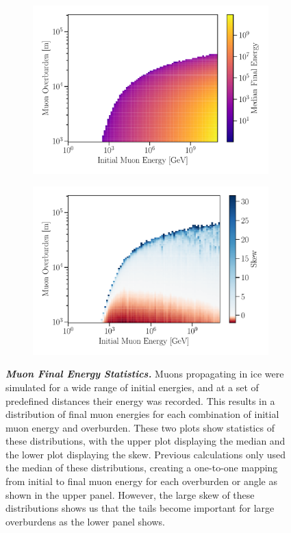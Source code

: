 \begin{figure}
	\centering
    \begin{subfigure}{\linewidth}
		\centering
		\includegraphics[width=0.8\linewidth]{figures/preach_median}
	\end{subfigure}
	\begin{subfigure}{\linewidth}
		\centering
		\includegraphics[width=0.8\linewidth]{figures/preach_skew}
	\end{subfigure}
	\caption{\textbf{\textit{Muon Final Energy Statistics.}} Muons propagating in ice were simulated for a wide range of initial energies, and at a set of predefined distances their energy was recorded.
	This results in a distribution of final muon energies for each combination of initial muon energy and overburden.
	These two plots show statistics of these distributions, with the upper plot displaying the median and the lower plot displaying the skew.
	Previous calculations only used the median of these distributions, creating a one-to-one mapping from initial to final muon energy for each overburden or angle as shown in the upper panel.
	However, the large skew of these distributions shows us that the tails become important for large overburdens as the lower panel shows.
	}
	\label{fig:preach_stats}
\end{figure}

